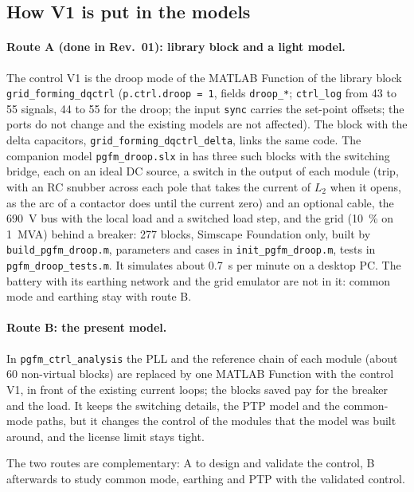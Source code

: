 \documentclass[11pt,a4paper]{scrartcl}
\newcommand{\code}[1]{\texttt{#1}}
\begin{document}
\begin{onehalfspace}
\subsection{How V1 is put in the models}
\label{sec:routes}

\paragraph{Route A (done in Rev.~01): library block and a light model.} The control V1 is the droop mode of the MATLAB Function of the library block \code{grid\_forming\_dqctrl} \cite{afe_note} (\code{p.ctrl.droop = 1}, fields \code{droop\_*}; \code{ctrl\_log} from 43 to 55 signals, 44 to 55 for the droop; the input \code{sync} carries the set-point offsets; the ports do not change and the existing models are not affected). The block with the delta capacitors, \code{grid\_forming\_dqctrl\_delta}, links the same code. The companion model \code{pgfm\_droop.slx} in  has three such blocks with the switching bridge, each on an ideal DC source, a switch in the output of each module (trip, with an RC snubber across each pole that takes the current of $L_2$ when it opens, as the arc of a contactor does until the current zero) and an optional cable, the \SI{690}{V} bus with the local load and a switched load step, and the grid (\SI{10}{\percent} on \SI{1}{MVA}) behind a breaker: 277 blocks, Simscape Foundation only, built by \code{build\_pgfm\_droop.m}, parameters and cases in \code{init\_pgfm\_droop.m}, tests in \code{pgfm\_droop\_tests.m}. It simulates about \SI{0.7}{s} per minute on a desktop PC. The battery with its earthing network and the grid emulator are not in it: common mode and earthing stay with route B.

\paragraph{Route B: the present model.} In \code{pgfm\_ctrl\_analysis} the PLL and the reference chain of each module (about 60 non-virtual blocks) are replaced by one MATLAB Function with the control V1, in front of the existing current loops; the blocks saved pay for the breaker and the load. It keeps the switching details, the PTP model and the common-mode paths, but it changes the control of the modules that the model was built around, and the license limit stays tight.

The two routes are complementary: A to design and validate the control, B afterwards to study common mode, earthing and PTP with the validated control.


\end{onehalfspace}
\end{document}
